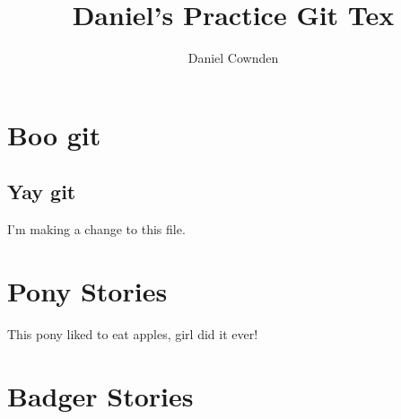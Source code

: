 \documentclass[11pt]{amsart}
\title{Daniel's Practice Git Tex}
\author{Daniel Cownden}
\begin{document}
\maketitle
\section{Boo git}
\subsection{Yay git}

I'm making a change to this file.

\section{Pony Stories}
This pony liked to eat apples, girl did it ever!

\section{Badger Stories}
\end{document}

